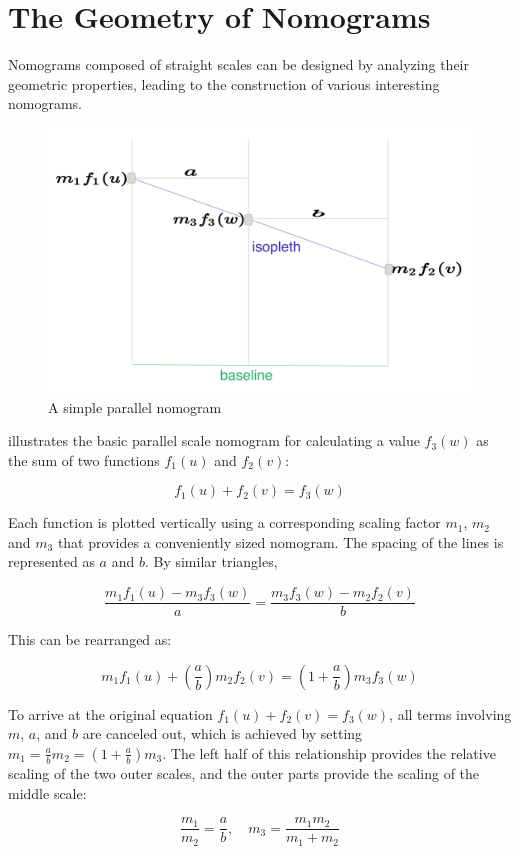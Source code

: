 \documentclass{l4proj}
\begin{document}
    \section{The Geometry of Nomograms}


Nomograms composed of straight scales can be designed by analyzing their geometric properties, leading to the construction of various interesting nomograms. 
\begin{figure}[H]
    \centering
    \includegraphics[width=0.75\linewidth]{dissertation/images/myFigures/background/nomogram.pdf}
    \caption{A simple parallel nomogram}
    \label{fig:nomogram}
\end{figure}

  illustrates the basic parallel scale nomogram for calculating a value $f_3(w)$ as the sum of two functions $f_1(u)$ and $f_2(v)$:

\[ f_1(u) + f_2(v) = f_3(w) \]

Each function is plotted vertically using a corresponding scaling factor $m_1$, $m_2$ and $m_3$ that provides a conveniently sized nomogram. The spacing of the lines is represented as $a$ and $b$. By similar triangles, 

\[ \frac{m_1f_1(u) - m_3f_3(w)}{a} = \frac{m_3f_3(w) - m_2f_2(v)}{b} \]

This can be rearranged as:

\[ m_1f_1(u) + \left(\frac{a}{b}\right)m_2f_2(v) = \left(1 + \frac{a}{b}\right)m_3f_3(w) \]

To arrive at the original equation $f_1(u) + f_2(v) = f_3(w)$, all terms involving $m$, $a$, and $b$ are canceled out, which is achieved by setting $m_1 = \frac{a}{b} m_2 = \left(1 + \frac{a}{b}\right) m_3$. The left half of this relationship provides the relative scaling of the two outer scales, and the outer parts provide the scaling of the middle scale:

\[ \frac{m_1}{m_2} = \frac{a}{b}, \quad m_3 = \frac{m_1m_2}{m_1+ m_2} \]
\end{document}
